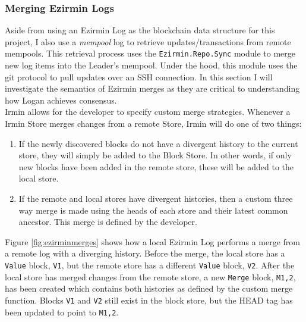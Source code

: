 \documentclass[12pt,a4paper,twoside,openright]{report}
\begin{document}
	\subsubsection*{Merging Ezirmin Logs}
	Aside from using an Ezirmin Log as the blockchain data structure for this project, I also use a \textit{mempool} log to retrieve updates/transactions from remote mempools. 
	This retrieval process uses the \texttt{Ezirmin.Repo.Sync} module to merge new log items into the Leader's mempool.
	Under the hood, this module uses the git protocol to pull updates over an SSH connection.
	In this section I will investigate the semantics of Ezirmin merges as they are critical to understanding how Logan achieves consensus.\\
	
	Irmin allows for the developer to specify custom merge strategies. 
	Whenever a Irmin Store merges changes from a remote Store, Irmin will do one of two things:
	\begin{enumerate}
		\item If the newly discovered blocks do not have a divergent history to the current store, they will simply be added to the Block Store. 
			In other words, if only new blocks have been added in the remote store, these will be added to the local store. 
		\item If the remote and local stores have divergent histories, then a custom three way merge is made using the heads of each store and their latest common ancestor.
			This merge is defined by the developer.
	\end{enumerate}
	Figure \ref{fig:ezirminmerges} shows how a local Ezirmin Log performs a merge from a remote log with a diverging history.
	Before the merge, the local store has a \texttt{Value} block, \texttt{V1}, but the remote store has a different \texttt{Value} block, \texttt{V2}.
	After the local store has merged changes from the remote store, a new \texttt{Merge} block, \texttt{M1,2}, has been created which contains both histories as defined by the custom merge function. 
	Blocks \texttt{V1} and \texttt{V2} still exist in the block store, but the HEAD tag has been updated to point to \texttt{M1,2}. \\
\end{document}
